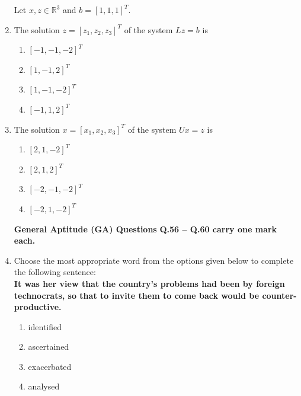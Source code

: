 \documentclass[journal]{IEEEtran}
\numberwithin{equation}{enumi}
\numberwithin{figure}{enumi}
\begin{document}
\begin{enumerate}
Let $x, z \in \mathbb{R}^3$ and $b = [1, 1, 1]^T$.
\newpage
\item The solution $z = [z_1, z_2, z_3]^T$ of the system $Lz = b$ is
\hfill{}
\begin{multicols}{4}
\begin{enumerate}
   \item $[-1, -1, -2]^T$
   \item $[1, -1, 2]^T$
   \item $[1, -1, -2]^T$
    \item $[-1, 1, 2]^T$
\end{enumerate}
\end{multicols}




\item The solution $x = [x_1, x_2, x_3]^T$ of the system $Ux = z$ is
\hfill{}
\begin{multicols}{4}
\begin{enumerate}
   \item $[2, 1, -2]^T$
   \item $[2, 1, 2]^T$
   \item $[-2, -1, -2]^T$
    \item $[-2, 1, -2]^T$
\end{enumerate}
\end{multicols}


\vspace{1em}
\textbf{General Aptitude (GA) Questions}
\newline
\textbf{Q.56 -- Q.60 carry one mark each.}\\


\item Choose the most appropriate word from the options given below to complete the following sentence:\\
\textbf{It was her view that the country's problems had been \underline{\hspace{2cm}} by foreign technocrats, so that to invite them to come back would be counter-productive.}
\hfill{}
\begin{enumerate}
    \item identified
     \item ascertained
     \item exacerbated
     \item analysed
\end{enumerate}
    


\end{enumerate}
\end{document}

